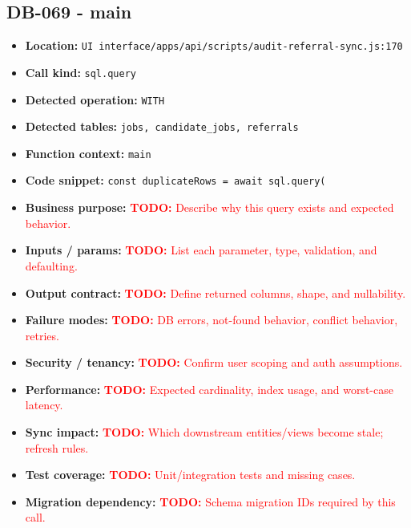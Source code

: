 \documentclass[11pt]{article}
\newcommand{\todoitem}[1]{\textcolor{red}{\textbf{TODO:} #1}}
\begin{document}
\subsection{DB-069 - main}
\begin{itemize}[leftmargin=1.5em]
\item \textbf{Location:} \texttt{UI interface/apps/api/scripts/audit-referral-sync.js:170}
\item \textbf{Call kind:} \texttt{sql.query}
\item \textbf{Detected operation:} \texttt{WITH}
\item \textbf{Detected tables:} \texttt{jobs, candidate\_jobs, referrals}
\item \textbf{Function context:} \texttt{main}
\item \textbf{Code snippet:} \texttt{const duplicateRows = await sql.query(}
\item \textbf{Business purpose:} \todoitem{Describe why this query exists and expected behavior.}
\item \textbf{Inputs / params:} \todoitem{List each parameter, type, validation, and defaulting.}
\item \textbf{Output contract:} \todoitem{Define returned columns, shape, and nullability.}
\item \textbf{Failure modes:} \todoitem{DB errors, not-found behavior, conflict behavior, retries.}
\item \textbf{Security / tenancy:} \todoitem{Confirm user scoping and auth assumptions.}
\item \textbf{Performance:} \todoitem{Expected cardinality, index usage, and worst-case latency.}
\item \textbf{Sync impact:} \todoitem{Which downstream entities/views become stale; refresh rules.}
\item \textbf{Test coverage:} \todoitem{Unit/integration tests and missing cases.}
\item \textbf{Migration dependency:} \todoitem{Schema migration IDs required by this call.}
\end{itemize}
\end{document}
